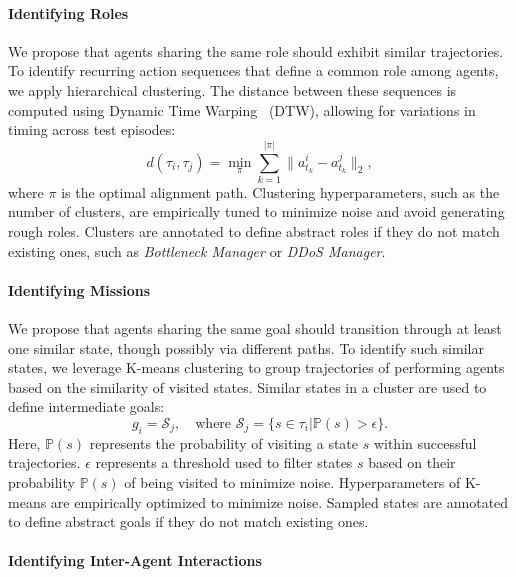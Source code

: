 \paragraph*{\textbf{Identifying Roles}}

We propose that agents sharing the same role should exhibit similar trajectories. To identify recurring action sequences that define a common role among agents, we apply hierarchical clustering. The distance between these sequences is computed using Dynamic Time Warping~\cite{berndt1994using} (DTW), allowing for variations in timing across test episodes:
\[
d(\tau_i, \tau_j) = \min_{\pi} \sum_{k=1}^{|\pi|} \|a_{t_k}^i - a_{t_k}^j\|_2,
\]
where $\pi$ is the optimal alignment path. Clustering hyperparameters, such as the number of clusters, are empirically tuned to minimize noise and avoid generating rough roles. Clusters are annotated to define abstract roles if they do not match existing ones, such as \textit{Bottleneck Manager} or \textit{DDoS Manager}.

\paragraph*{\textbf{Identifying Missions}}

We propose that agents sharing the same goal should transition through at least one similar state, though possibly via different paths. To identify such similar states, we leverage K-means clustering to group trajectories of performing agents based on the similarity of visited states. Similar states in a cluster are used to define intermediate goals:
\[
g_i = \mathcal{S}_j, \quad \text{where } \mathcal{S}_j = \{s \in \tau_i | \mathbb{P}(s) > \epsilon\}.
\]
Here, $\mathbb{P}(s)$ represents the probability of visiting a state $s$ within successful trajectories. $\epsilon$ represents a threshold used to filter states $s$ based on their probability $\mathbb{P}(s)$ of being visited to minimize noise. Hyperparameters of K-means are empirically optimized to minimize noise. Sampled states are annotated to define abstract goals if they do not match existing ones.


\paragraph*{\textbf{Identifying Inter-Agent Interactions}}

